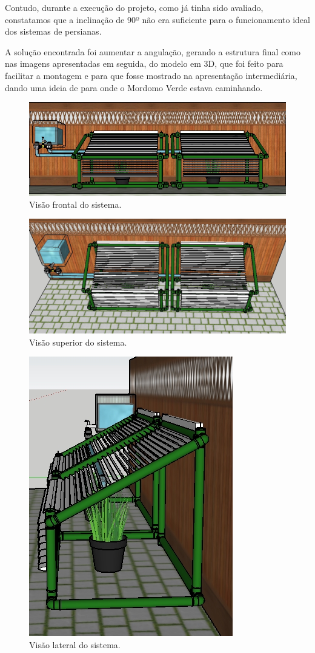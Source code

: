 \documentclass[a4paper,12pt]{report}
\begin{document}
	Contudo, durante a execução do projeto, como já tinha sido avaliado, constatamos que a inclinação de 90º não era suficiente para o funcionamento ideal dos sistemas de persianas.
	
	A solução encontrada foi aumentar a angulação, gerando a estrutura final como nas imagens apresentadas em seguida, do modelo em 3D, que foi feito para facilitar a montagem e para que fosse mostrado na apresentação intermediária, dando uma ideia de para onde o Mordomo Verde estava caminhando.
	
	
	
	\begin{figure}[!h]
	\centering
	\includegraphics[width=1.0\linewidth]{figs/estru1}
	\caption{Visão frontal do sistema.}
	\label{fig:estru1}
	\end{figure}

	\begin{figure}[!h]
	\centering
	\includegraphics[width=1.0\linewidth]{figs/estru2}
	\caption{Visão superior do sistema.}
	\label{fig:estru2}
	\end{figure}

	\begin{figure}[!h]
	\centering
	\includegraphics[width=0.4\linewidth]{figs/estru3}
	\caption{Visão lateral do sistema.}
	\label{fig:estru3}
	\end{figure}
\end{document}
